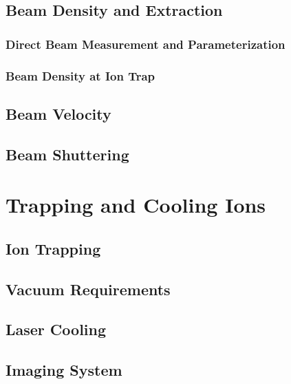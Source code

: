 \documentclass [PhD,nolistoftables,scheader] {uclathes}
\begin{document}
	\section{Beam Density and Extraction} \label{sec: beam density}
	
		
		\subsection{Direct Beam Measurement and Parameterization}
		
	
		\subsection{Beam Density at Ion Trap} \label{sec: trap beam density}
		
	
	\section{Beam Velocity}
	
	
	\section{Beam Shuttering}
	

\chapter{Trapping and Cooling Ions}


	\section{Ion Trapping}
	
	
	\section{Vacuum Requirements}
	
	
	\section{ Laser Cooling}
	
	
	\section{Imaging System}
	
	
\end{document}
